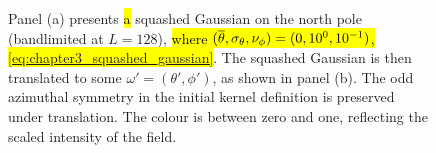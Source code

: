 \begin{figure}[htpb]
	\centering\capstart{}
	\hfill
	\caption[
		A squashed Gaussian on the north pole and then translated
	]{
		Panel (a) presents \hl{a} squashed Gaussian on the north pole (bandlimited at \(L=128\)), \hl{where \mbox{\((\overline{\theta},\sigma_{\theta},\nu_{\phi}) = (0,10^{0},10^{-1})\)}, \cf{} \mbox{\cref{eq:chapter3_squashed_gaussian}}}.
		The squashed Gaussian is then translated to some \(\omega'=(\theta',\phi')\), as shown in panel (b).
		The odd azimuthal symmetry in the initial kernel definition is preserved under translation.
		The colour is between zero and one, reflecting the scaled intensity of the field.
	}\label{fig:chapter3_squashed_gaussian}
\end{figure}
